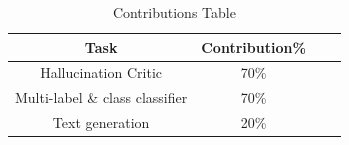 \documentclass[11pt]{article}
\begin{document}
\begin{table}[h!]
\centering
\begin{tabular}{c c c c} 
 \hline
 Task & Contribution\%\\
 \hline
 \hline
Hallucination Critic & 70\% \\
Multi-label \& class classifier & 70\% \\
Text generation & 20\% \\
 \hline
\end{tabular}
\caption{Contributions Table}
\label{table:1}
\end{table}

\nocite{dziri2022faithdial,raffel2020exploring, dathathri2020plug, chalkidis2020empirical, filippova-2020-controlled}



\appendix
\end{document}
